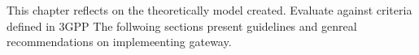 This chapter reflects on the theoretically model created. Evaluate against criteria defined in 3GPP
The follwoing sections present guidelines and genreal recommendations on implemeenting gateway.






